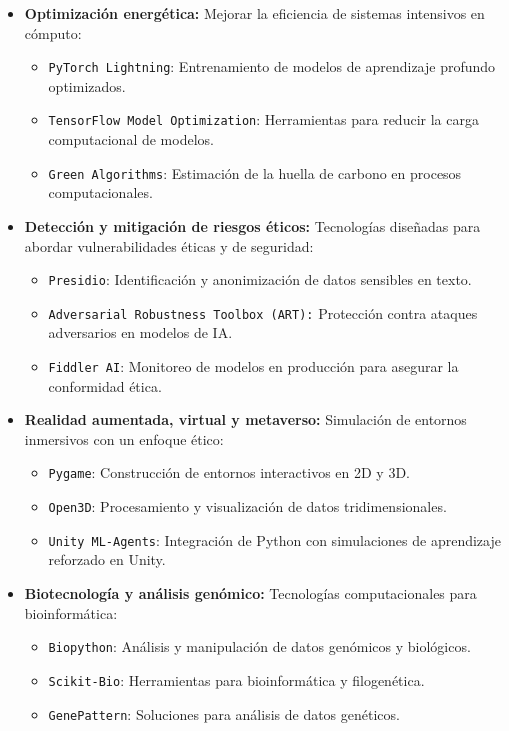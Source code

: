 \begin{refsection}
\begin{itemize}
    \item \textbf{Optimización energética:}  
    Mejorar la eficiencia de sistemas intensivos en cómputo:
    \begin{itemize}
        \item \texttt{PyTorch Lightning}: Entrenamiento de modelos de aprendizaje profundo optimizados.
        \item \texttt{TensorFlow Model Optimization}: Herramientas para reducir la carga computacional de modelos.
        \item \texttt{Green Algorithms}: Estimación de la huella de carbono en procesos computacionales.
    \end{itemize}

    \item \textbf{Detección y mitigación de riesgos éticos:}  
    Tecnologías diseñadas para abordar vulnerabilidades éticas y de seguridad:
    \begin{itemize}
        \item \texttt{Presidio}: Identificación y anonimización de datos sensibles en texto.
        \item \texttt{Adversarial Robustness Toolbox (ART):} Protección contra ataques adversarios en modelos de IA.
        \item \texttt{Fiddler AI}: Monitoreo de modelos en producción para asegurar la conformidad ética.
    \end{itemize}

    \item \textbf{Realidad aumentada, virtual y metaverso:}  
    Simulación de entornos inmersivos con un enfoque ético:
    \begin{itemize}
        \item \texttt{Pygame}: Construcción de entornos interactivos en 2D y 3D.
        \item \texttt{Open3D}: Procesamiento y visualización de datos tridimensionales.
        \item \texttt{Unity ML-Agents}: Integración de Python con simulaciones de aprendizaje reforzado en Unity.
    \end{itemize}

    \item \textbf{Biotecnología y análisis genómico:}  
    Tecnologías computacionales para bioinformática:
    \begin{itemize}
        \item \texttt{Biopython}: Análisis y manipulación de datos genómicos y biológicos.
        \item \texttt{Scikit-Bio}: Herramientas para bioinformática y filogenética.
        \item \texttt{GenePattern}: Soluciones para análisis de datos genéticos.
    \end{itemize}


\end{itemize}
\end{refsection}
